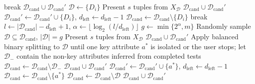 \begin{algorithm}[!t]
\begin{algorithmic}[1]
     break
    \EndIf
     
                \State \Return $\mathcal{D}_\text{cand}\cup\mathcal{D}_\text{cand}'$
            \EndIf
            \State $\mathcal{D} \gets \{D_i\}$
            \State Present $s$ tuples from $X_\mathcal{D}$
                \State \Return $\mathcal{D}_\text{cand}\cup\mathcal{D}_\text{cand}'$
            \EndIf
                \State $\mathcal{D}_\text{cand}' \gets \mathcal{D}_\text{cand}' \cup \{D_i\}$, $d_\text{left} \gets d_\text{left} - 1$
            \EndIf
            \State $\mathcal{D}_\text{cand} \gets \mathcal{D}_\text{cand} \setminus \{D_i\}$
             break
            \EndIf
        \EndFor
    \Else {}
        \State $l \gets |\mathcal{D}_\text{cand}| - d_\text{left} + 1$, $\alpha \gets \lfloor \log_2(l/d_\text{left}) \rfloor$
        \State $g \gets \min\{2^\alpha,m\}$
        \State Randomly sample $\mathcal{D} \subseteq \mathcal{D}_\text{cand}$, $|\mathcal{D}| = g$
        \State Present $s$ tuples from $X_\mathcal{D}$
            \State \Return $\mathcal{D}_\text{cand}\cup\mathcal{D}_\text{cand}'$
        \EndIf
            \State Apply balanced binary splitting to $\mathcal{D}$ until one key attribute $a^*$ is isolated or the user stops; let $\mathcal{D}_{-}$ contain the non-key attributes inferred from completed tests
            \State $\mathcal{D}_\text{cand}\gets\mathcal{D}_\text{cand}\setminus\mathcal{D}_{-}$
                \State \Return $\mathcal{D}_\text{cand}\cup\mathcal{D}_\text{cand}'$
            \EndIf
            \State $\mathcal{D}_\text{cand}' \gets \mathcal{D}_\text{cand}' \cup \{a^*\}$, $d_\text{left} \gets d_\text{left} - 1$
            \State $\mathcal{D}_\text{cand} \gets \mathcal{D}_\text{cand} \setminus \{a^*\}$
        \Else
            \State $\mathcal{D}_\text{cand} \gets \mathcal{D}_\text{cand} \setminus \mathcal{D}$
        \EndIf
    \EndIf
\EndWhile
\State \Return $\mathcal{D}_\text{cand}\cup \mathcal{D}_\text{cand}'$
\end{algorithmic}
\end{algorithm}

